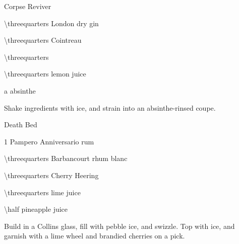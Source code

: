 \begin{Cocktail}[\PDT]{Corpse Reviver }
  \begin{Ingredients}
  \item \SI{\threequarters}{\oz} London dry gin
  \item \SI{\threequarters}{\oz} Cointreau
  \item \SI{\threequarters}{\oz} \Lillet
  \item \SI{\threequarters}{\oz} lemon juice
  \item a \si{\dash} absinthe
  \end{Ingredients}
  
  \begin{Instructions}
	Shake ingredients with ice, and strain into an absinthe-rinsed coupe.
  \end{Instructions}
\end{Cocktail}

%   
%     

\begin{Cocktail}[\PDT]{Death Bed}
  \begin{Ingredients}
  \item \SI{1}{\oz} Pampero Anniversario rum
  \item \SI{\threequarters}{\oz} Barbancourt rhum blanc
  \item \SI{\threequarters}{\oz} Cherry Heering
  \item \SI{\threequarters}{\oz} lime juice
  \item \SI{\half}{\oz} pineapple juice
  \end{Ingredients}
  
  \begin{Instructions}
	Build in a Collins glass, fill with pebble ice, and swizzle.  Top with ice, and garnish with a lime wheel and brandied cherries on a pick.
  \end{Instructions}
\end{Cocktail}

